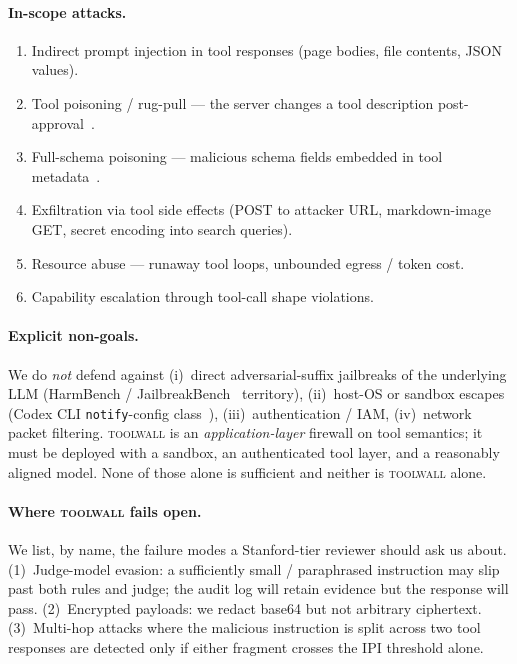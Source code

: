 \paragraph{In-scope attacks.}
\begin{enumerate}[leftmargin=*,nosep]
\item Indirect prompt injection in tool responses (page bodies,
file contents, JSON values).
\item Tool poisoning / rug-pull --- the server changes a tool
description post-approval~\cite{invariant2025toolpoisoning}.
\item Full-schema poisoning --- malicious schema fields embedded
in tool metadata~\cite{cyberark2025schema}.
\item Exfiltration via tool side effects (POST to attacker URL,
markdown-image GET, secret encoding into search queries).
\item Resource abuse --- runaway tool loops, unbounded
egress / token cost.
\item Capability escalation through tool-call shape violations.
\end{enumerate}

\paragraph{Explicit non-goals.}
We do \emph{not} defend against (i)~direct adversarial-suffix
jailbreaks of the underlying LLM (HarmBench /
JailbreakBench~\cite{harmbench2024,jbb2024} territory),
(ii)~host-OS or sandbox escapes (Codex CLI \texttt{notify}-config
class~\cite{cymulate2026codex}),
(iii)~authentication / IAM,
(iv)~network packet filtering. \textsc{toolwall} is an
\emph{application-layer} firewall on tool semantics; it must be
deployed with a sandbox, an authenticated tool layer, and a
reasonably aligned model. None of those alone is sufficient and
neither is \textsc{toolwall} alone.

\paragraph{Where \textsc{toolwall} fails open.}
We list, by name, the failure modes a Stanford-tier reviewer
should ask us about. (1)~Judge-model evasion: a sufficiently
small / paraphrased instruction may slip past both rules and
judge; the audit log will retain evidence but the response will
pass. (2)~Encrypted payloads: we redact base64 but not arbitrary
ciphertext. (3)~Multi-hop attacks where the malicious instruction
is split across two tool responses are detected only if either
fragment crosses the IPI threshold alone.

